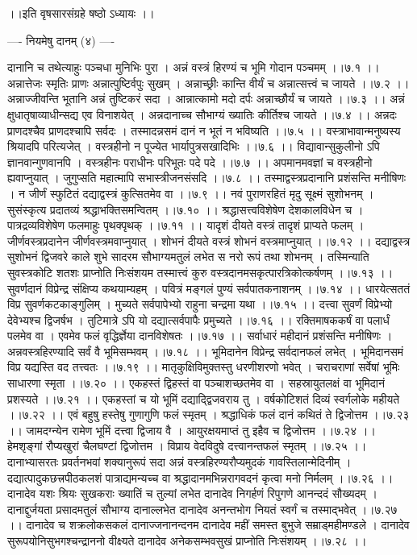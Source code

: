 \documentclass[11pt]{book}
\begin{document}
\begin{landscape}
 ।।इति वृषसारसंग्रहे षष्ठो ऽध्यायः ।।





---- नियमेषु दानम् (४) ----

दानानि च तथेत्याहुः पञ्चधा मुनिभिः पुरा ।
अन्नं वस्त्रं हिरण्यं च भूमि गोदान पञ्चमम् ।।७.१ ।।
अन्नात्तेजः स्मृतिः प्राणः अन्नात्पुष्टिर्वपुः सुखम् ।
अन्नाच्छ्रीः कान्ति वीर्यं च अन्नात्सत्त्वं च जायते ।।७.२ ।।
अन्नाज्जीवन्ति भूतानि अन्नं तुष्टिकरं सदा ।
आन्नात्कामो मदो दर्पः अन्नाच्छौर्यं च जायते ।।७.३ ।।
अन्नं क्षुधातृषाव्याधीन्सद्य एव विनाशयेत् ।
अन्नदानाच्च सौभाग्यं ख्यातिः कीर्तिश्च जायते ।।७.४ ।।
अन्नदः प्राणदश्चैव प्राणदश्चापि सर्वदः ।
तस्मादन्नसमं दानं न भूतं न भविष्यति ।।७.५ ।।
वस्त्राभावान्मनुष्यस्य श्रियादपि परित्यजेत् ।
वस्त्रहीनो न पूज्येत भार्यापुत्रसखादिभिः ।।७.६ ।।
विद्यावान्सुकुलीनो ऽपि ज्ञानवान्गुणवानपि ।
वस्त्रहीनः पराधीनः परिभूतः पदे पदे ।।७.७ ।।
अपमानमवज्ञां च वस्त्रहीनो ह्यवाप्नुयात् ।
जुगुप्सति महात्मापि सभास्त्रीजनसंसदि ।।७.८ ।।
तस्माद्वस्त्रप्रदानानि प्रशंसन्ति मनीषिणः ।
न जीर्णं स्फुटितं दद्याद्वस्त्रं कुत्सितमेव वा ।।७.९ ।।
नवं पुराणरहितं मृदु सूक्ष्मं सुशोभनम् ।
सुसंस्कृत्य प्रदातव्यं श्रद्धाभक्तिसमन्वितम् ।।७.१० ।।
श्रद्धासत्त्वविशेषेण देशकालविधेन च ।
पात्रद्रव्यविशेषेण फलमाहुः पृथक्पृथक् ।।७.११ ।।
यादृशं दीयते वस्त्रं तादृशं प्राप्यते फलम् ।
जीर्णवस्त्रप्रदानेन जीर्णवस्त्रमवाप्नुयात् ।
शोभनं दीयते वस्त्रं शोभनं वस्त्रमाप्नुयात् ।।७.१२ ।।
दद्याद्वस्त्र सुशोभनं द्विजवरे काले शुभे सादरम
सौभाग्यमतुलं लभेत स नरो रूपं तथा शोभनम् ।
तस्मिन्याति सुवस्त्रकोटि शतशः प्राप्नोति निःसंशयम
तस्मात्त्वं कुरु वस्त्रदानमसकृत्पारत्रिकोत्कर्षणम् ।।७.१३ ।।
सुवर्णदानं विप्रेन्द्र संक्षिप्य कथयाम्यहम् ।
पवित्रं मङ्गलं पुण्यं सर्वपातकनाशनम् ।।७.१४ ।।
धारयेत्सततं विप्र सुवर्णकटकाङ्गुलिम् ।
मुच्यते सर्वपापेभ्यो राहुना चन्द्रमा यथा ।।७.१५ ।।
दत्त्वा सुवर्णं विप्रेभ्यो देवेभ्यश्च द्विजर्षभ ।
तुटिमात्रे ऽपि यो दद्यात्सर्वपापैः प्रमुच्यते ।।७.१६ ।।
रक्तिमाषककर्षं वा पलार्धं पलमेव वा ।
एवमेव फलं वृद्धिर्ज्ञेया दानविशेषतः ।।७.१७ ।।
सर्वाधारं महीदानं प्रशंसन्ति मनीषिणः ।
अन्नवस्त्रहिरण्यादि सर्वं वै भूमिसम्भवम् ।।७.१८ ।।
भूमिदानेन विप्रेन्द्र सर्वदानफलं लभेत् ।
भूमिदानसमं विप्र यद्यस्ति वद तत्त्वतः ।।७.१९ ।।
मातृकुक्षिविमुक्तस्तु धरणीशरणो भवेत् ।
चराचराणां सर्वेषां भूमिः साधारणा स्मृता ।।७.२० ।।
एकहस्तं द्विहस्तं वा पञ्चाशच्छतमेव वा ।
सहस्रायुतलक्षं वा भूमिदानं प्रशस्यते ।।७.२१ ।।
एकहस्तां च यो भूमिं दद्याद्द्विजवराय तु ।
वर्षकोटिशतं दिव्यं स्वर्गलोके महीयते ।।७.२२ ।।
एवं बहुषु हस्तेषु गुणागुणि फलं स्मृतम् ।
श्रद्धाधिकं फलं दानं कथितं ते द्विजोत्तम ।।७.२३ ।।
जामदग्न्येन रामेण भूमिं दत्त्वा द्विजाय वै ।
आयुरक्षयमाप्तं तु इहैव च द्विजोत्तम ।।७.२४ ।।
हेमशृङ्गां रौप्यखुरां चैलघण्टां द्विजोत्तम ।
विप्राय वेदविदुषे दत्त्वानन्तफलं स्मृतम् ।।७.२५ ।।
दानाभ्यासरतः प्रवर्तनभवां शक्यानुरूपं सदा
अन्नं वस्त्रहिरण्यरौप्यमुदकं गावस्तिलान्मेदिनीम् ।
दद्यात्पादुकछत्त्रपीठकलशं पात्राद्यमन्यच्च वा
श्रद्धादानमभिन्नरागवदनं कृत्वा मनो निर्मलम् ।।७.२६ ।।
दानादेव यशः श्रियः सुखकराः ख्यातिं च तुल्यां लभेत
दानादेव निगर्हणं रिपुगणे आनन्ददं सौख्यदम् ।
दानाद्दुर्जयता प्रसादमतुलं सौभाग्य दानाल्लभेत
दानादेव अनन्तभोग नियतं स्वर्गं च तस्माद्भवेत् ।।७.२७ ।।
दानादेव च शक्रलोकसकलं दानाज्जनानन्दनम
दानादेव महीं समस्त बुभुजे सम्राड्महीमण्डले ।
दानादेव सुरूपयोनिसुभगश्चन्द्राननो वीक्ष्यते
दानादेव अनेकसम्भवसुखं प्राप्नोति निःसंशयम् ।।७.२८ ।।


\end{landscape}
\end{document}
